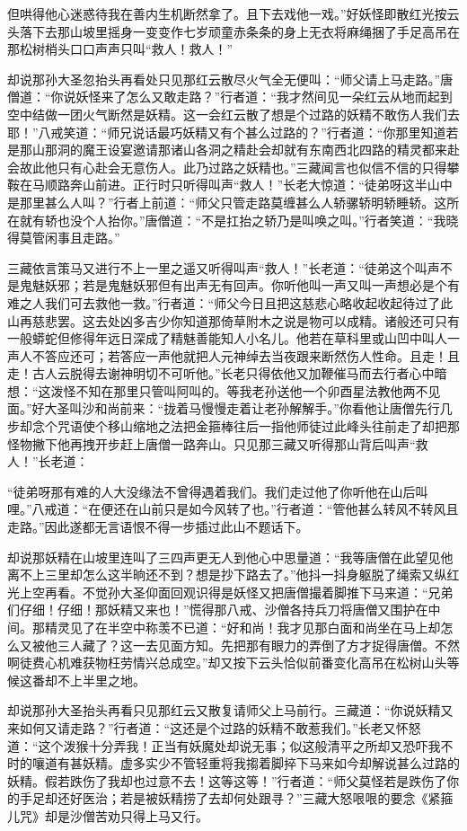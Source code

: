 \documentclass[12pt,UTF8]{ctexbook}
\begin{document}
但哄得他心迷惑待我在善内生机断然拿了。且下去戏他一戏。”好妖怪即散红光按云头落下去那山坡里摇身一变变作七岁顽童赤条条的身上无衣将麻绳捆了手足高吊在那松树梢头口口声声只叫“救人！救人！”

却说那孙大圣忽抬头再看处只见那红云散尽火气全无便叫：“师父请上马走路。”唐僧道：“你说妖怪来了怎么又敢走路？”行者道：“我才然间见一朵红云从地而起到空中结做一团火气断然是妖精。这一会红云散了想是个过路的妖精不敢伤人我们去耶！”八戒笑道：“师兄说话最巧妖精又有个甚么过路的？”行者道：“你那里知道若是那山那洞的魔王设宴邀请那诸山各洞之精赴会却就有东南西北四路的精灵都来赴会故此他只有心赴会无意伤人。此乃过路之妖精也。”三藏闻言也似信不信的只得攀鞍在马顺路奔山前进。正行时只听得叫声“救人！”长老大惊道：“徒弟呀这半山中是那里甚么人叫？”行者上前道：“师父只管走路莫缠甚么人轿骡轿明轿睡轿。这所在就有轿也没个人抬你。”唐僧道：“不是扛抬之轿乃是叫唤之叫。”行者笑道：“我晓得莫管闲事且走路。”

三藏依言策马又进行不上一里之遥又听得叫声“救人！”长老道：“徒弟这个叫声不是鬼魅妖邪；若是鬼魅妖邪但有出声无有回声。你听他叫一声又叫一声想必是个有难之人我们可去救他一救。”行者道：“师父今日且把这慈悲心略收起收起待过了此山再慈悲罢。这去处凶多吉少你知道那倚草附木之说是物可以成精。诸般还可只有一般蟒蛇但修得年远日深成了精魅善能知人小名儿。他若在草科里或山凹中叫人一声人不答应还可；若答应一声他就把人元神绰去当夜跟来断然伤人性命。且走！且走！古人云脱得去谢神明切不可听他。”长老只得依他又加鞭催马而去行者心中暗想：“这泼怪不知在那里只管叫阿叫的。等我老孙送他一个卯酉星法教他两不见面。”好大圣叫沙和尚前来：“拢着马慢慢走着让老孙解解手。”你看他让唐僧先行几步却念个咒语使个移山缩地之法把金箍棒往后一指他师徒过此峰头往前走了却把那怪物撇下他再拽开步赶上唐僧一路奔山。只见那三藏又听得那山背后叫声“救人！”长老道：

“徒弟呀那有难的人大没缘法不曾得遇着我们。我们走过他了你听他在山后叫哩。”八戒道：“在便还在山前只是如今风转了也。”行者道：“管他甚么转风不转风且走路。”因此遂都无言语恨不得一步插过此山不题话下。

却说那妖精在山坡里连叫了三四声更无人到他心中思量道：“我等唐僧在此望见他离不上三里却怎么这半晌还不到？想是抄下路去了。”他抖一抖身躯脱了绳索又纵红光上空再看。不觉孙大圣仰面回观识得是妖怪又把唐僧撮着脚推下马来道：“兄弟们仔细！仔细！那妖精又来也！”慌得那八戒、沙僧各持兵刀将唐僧又围护在中间。那精灵见了在半空中称羡不已道：“好和尚！我才见那白面和尚坐在马上却怎么又被他三人藏了？这一去见面方知。先把那有眼力的弄倒了方才捉得唐僧。不然啊徒费心机难获物枉劳情兴总成空。”却又按下云头恰似前番变化高吊在松树山头等候这番却不上半里之地。

却说那孙大圣抬头再看只见那红云又散复请师父上马前行。三藏道：“你说妖精又来如何又请走路？”行者道：“这还是个过路的妖精不敢惹我们。”长老又怀怒道：“这个泼猴十分弄我！正当有妖魔处却说无事；似这般清平之所却又恐吓我不时的嚷道有甚妖精。虚多实少不管轻重将我搊着脚捽下马来如今却解说甚么过路的妖精。假若跌伤了我却也过意不去！这等这等！”行者道：“师父莫怪若是跌伤了你的手足却还好医治；若是被妖精捞了去却何处跟寻？”三藏大怒哏哏的要念《紧箍儿咒》却是沙僧苦劝只得上马又行。
\end{document}
